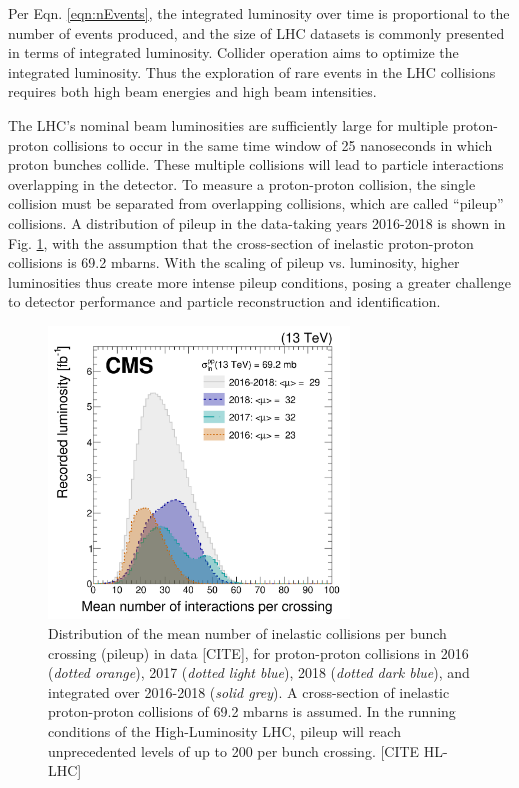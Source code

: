 Per Eqn. \ref{eqn:nEvents}, the integrated luminosity over time is proportional to the number of events produced, and the size of LHC datasets is commonly presented in terms of integrated luminosity. Collider operation aims to optimize the integrated luminosity. Thus the exploration of rare events in the LHC collisions requires both high beam energies and high beam intensities.

The LHC's nominal beam luminosities are sufficiently large for multiple proton-proton collisions to occur in the same time window of 25 nanoseconds in which proton bunches collide. These multiple collisions will lead to particle interactions overlapping in the detector. To measure a proton-proton collision, the single collision must be separated from overlapping collisions, which are called ``pileup'' collisions. A distribution of pileup in the data-taking years 2016-2018 is shown in Fig. \ref{fig:pileup-run-2}, with the assumption that the cross-section of inelastic proton-proton collisions is 69.2 mbarns. With the scaling of pileup vs. luminosity, higher luminosities thus create more intense pileup conditions, posing a greater challenge to detector performance and particle reconstruction and identification.

\begin{figure}[ht]
    \centering
    \includegraphics[width=8cm]{figures/ch-2-cern-cms/pileup-run-2-CMS-JME-18-001_Figure_001.png}
    \caption{Distribution of the mean number of inelastic collisions per bunch crossing (pileup) in data [CITE], for proton-proton collisions in 2016 (\textit{dotted orange}), 2017 (\textit{dotted light blue}), 2018 (\textit{dotted dark blue}), and integrated over 2016-2018 (\textit{solid grey}). A cross-section of inelastic proton-proton collisions of 69.2 mbarns is assumed. In the running conditions of the High-Luminosity LHC, pileup will reach unprecedented levels of up to 200 per bunch crossing. [CITE HL-LHC]}
    \label{fig:pileup-run-2}
\end{figure}

